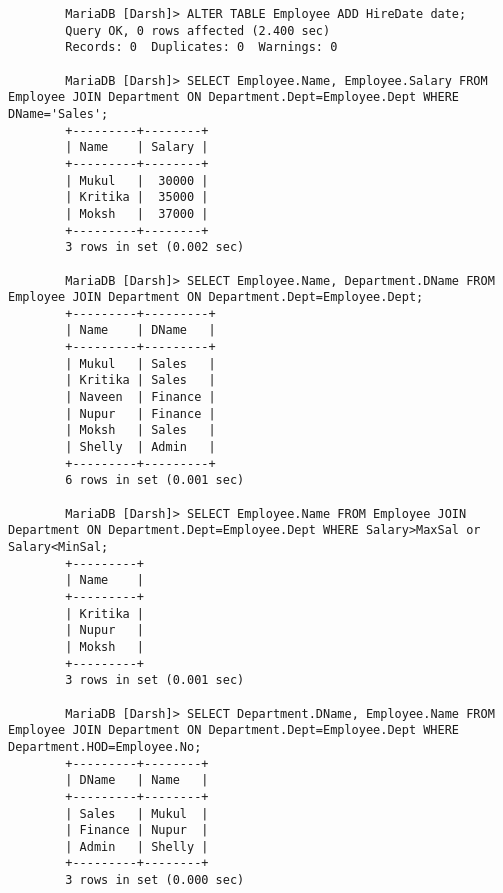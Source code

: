 \documentclass[
a4paper]{article}
\begin{document}
\begin{lstlisting}
		MariaDB [Darsh]> ALTER TABLE Employee ADD HireDate date;
		Query OK, 0 rows affected (2.400 sec)
		Records: 0  Duplicates: 0  Warnings: 0
		
		MariaDB [Darsh]> SELECT Employee.Name, Employee.Salary FROM Employee JOIN Department ON Department.Dept=Employee.Dept WHERE DName='Sales';
		+---------+--------+
		| Name    | Salary |
		+---------+--------+
		| Mukul   |  30000 |
		| Kritika |  35000 |
		| Moksh   |  37000 |
		+---------+--------+
		3 rows in set (0.002 sec)
		
		MariaDB [Darsh]> SELECT Employee.Name, Department.DName FROM Employee JOIN Department ON Department.Dept=Employee.Dept;
		+---------+---------+
		| Name    | DName   |
		+---------+---------+
		| Mukul   | Sales   |
		| Kritika | Sales   |
		| Naveen  | Finance |
		| Nupur   | Finance |
		| Moksh   | Sales   |
		| Shelly  | Admin   |
		+---------+---------+
		6 rows in set (0.001 sec)
		
		MariaDB [Darsh]> SELECT Employee.Name FROM Employee JOIN Department ON Department.Dept=Employee.Dept WHERE Salary>MaxSal or Salary<MinSal;
		+---------+
		| Name    |
		+---------+
		| Kritika |
		| Nupur   |
		| Moksh   |
		+---------+
		3 rows in set (0.001 sec)
		
		MariaDB [Darsh]> SELECT Department.DName, Employee.Name FROM Employee JOIN Department ON Department.Dept=Employee.Dept WHERE Department.HOD=Employee.No;
		+---------+--------+
		| DName   | Name   |
		+---------+--------+
		| Sales   | Mukul  |
		| Finance | Nupur  |
		| Admin   | Shelly |
		+---------+--------+
		3 rows in set (0.000 sec)
		
	\end{lstlisting}
	
	
	\newpage
	
\end{document}
